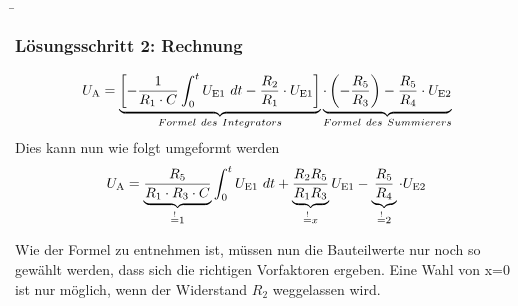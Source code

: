 \begin{frame}
    \b{   
        \frametitle{Lösungsschritt 2: Rechnung}
       
        \begin{equation}
            U_{\textnormal{A}} = \underbrace{\left[ -\frac{1}{R_1 \cdot C} \int_{0}^{t} U_{\textnormal{E1}}~dt -\frac{R_2}{R_1} \cdot U_{\textnormal{E1}} \right]}_{Formel~des~Integrators} \underbrace{\cdot\left(-\frac{R_5}{R_3}\right)-\frac{R_5}{R_4}\cdot U_{\textnormal{E2}}}_{Formel~des~Summierers} 
        \end{equation}
        Dies kann nun wie folgt umgeformt werden
        \begin{equation}
            U_{\textnormal{A}} = \underbrace{\frac{R_5}{R_1 \cdot R_3 \cdot C}}_{\stackrel{!}{=}1} \int_{0}^{t} U_{\textnormal{E1}}~dt + \underbrace{\frac{R_2 R_5}{R_1 R_3}}_{\stackrel{!}{=}x} U_{\textnormal{E1}} -\underbrace{\frac{R_5}{R_4}}_{\stackrel{!}{=}2} \cdot U_{\textnormal{E2}} 
        \end{equation}

        Wie der Formel zu entnehmen ist, müssen nun die Bauteilwerte nur noch so gewählt werden, dass sich die richtigen Vorfaktoren ergeben.
        Eine Wahl von x=0 ist nur möglich, wenn der Widerstand $R_2$ weggelassen wird. 
    }
\end{frame}

